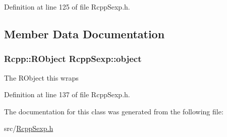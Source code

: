Definition at line 125 of file RcppSexp.h.

\subsection{Member Data Documentation}
\hypertarget{classRcppSexp_a9f77d55d1399aa8b7526357bc31204de}{
\subsubsection[{object}]{\setlength{\rightskip}{0pt plus 5cm}Rcpp::RObject {\bf RcppSexp::object}}}
\label{classRcppSexp_a9f77d55d1399aa8b7526357bc31204de}
The RObject this wraps 

Definition at line 137 of file RcppSexp.h.

The documentation for this class was generated from the following file:\begin{DoxyCompactItemize}
\item 
src/\hyperlink{RcppSexp_8h}{RcppSexp.h}\end{DoxyCompactItemize}
